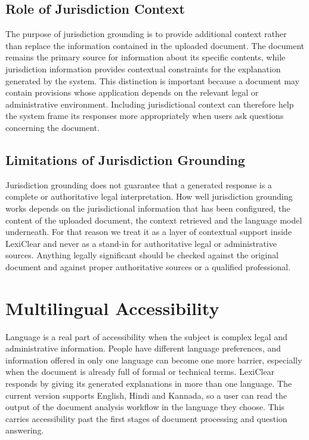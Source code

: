 \documentclass[12pt,a4paper,oneside]{report}
\begin{document}
\subsection{Role of Jurisdiction Context}

The purpose of jurisdiction grounding is to provide additional context rather
than replace the information contained in the uploaded document. The
document remains the primary source for information about its specific
contents, while jurisdiction information provides contextual constraints for
the explanation generated by the system. This distinction is important because a document may contain provisions whose
application depends on the relevant legal or administrative environment.
Including jurisdictional context can therefore help the system frame its
responses more appropriately when users ask questions concerning the
document.

\subsection{Limitations of Jurisdiction Grounding}

Jurisdiction grounding does not guarantee that a generated response is a
complete or authoritative legal interpretation. How well jurisdiction grounding works depends on the jurisdictional information that has been configured, the content of the uploaded document, the context retrieved and the language model underneath. For that reason we treat it as a layer of contextual support inside LexiClear and never as a stand-in for authoritative legal or administrative sources. Anything legally significant should be checked against the original document and against proper authoritative sources or a qualified professional.

\section{Multilingual Accessibility}

Language is a real part of accessibility when the subject is complex legal and administrative information. People have different language preferences, and information offered in only one language can become one more barrier, especially when the document is already full of formal or technical terms. LexiClear responds by giving its generated explanations in more than one language. The current version supports English, Hindi and Kannada, so a user can read the output of the document analysis workflow in the language they choose. This carries accessibility past the first stages of document processing and question answering.
\end{document}
